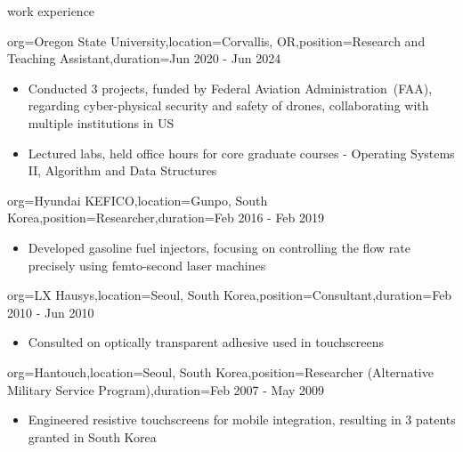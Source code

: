 \documentclass{resume}
\begin{document}
\begin{ResumeSection}{work experience}
    \begin{ResumeSubsection}{org=Oregon State University,location={Corvallis, OR},position={Research and Teaching Assistant},duration=Jun 2020 - Jun 2024}
        \begin{itemize}
            \item Conducted 3 projects, funded by Federal Aviation Administration~(FAA), regarding cyber-physical security and safety of drones, collaborating with multiple institutions in US
            \item Lectured labs, held office hours for core graduate courses - Operating Systems II, Algorithm and Data Structures
        \end{itemize}
    \end{ResumeSubsection}

    \begin{ResumeSubsection}{org={Hyundai KEFICO},location={Gunpo, South Korea},position={Researcher},duration={Feb 2016 - Feb 2019}}
        \begin{itemize}
            \item Developed gasoline fuel injectors, focusing on controlling the flow rate precisely using femto-second laser machines
        \end{itemize}
    \end{ResumeSubsection}

    \begin{ResumeSubsection}{org={LX Hausys},location={Seoul, South Korea},position={Consultant},duration={Feb 2010 - Jun 2010}}
        \begin{itemize}
            \item Consulted on optically transparent adhesive used in touchscreens
        \end{itemize}
    \end{ResumeSubsection}

    \begin{ResumeSubsection}{org={Hantouch},location={Seoul, South Korea},position={Researcher (Alternative Military Service Program)},duration={Feb 2007 - May 2009}}
        \begin{itemize}
            \item Engineered resistive touchscreens for mobile integration, resulting in 3 patents granted in South Korea
        \end{itemize}

    \end{ResumeSubsection}
\end{ResumeSection}
\end{document}
